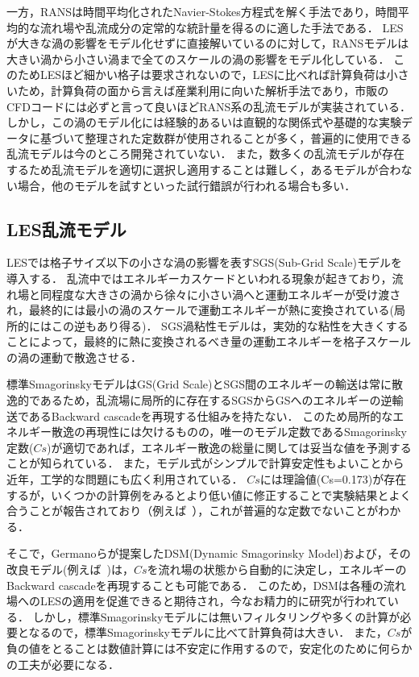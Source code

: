 一方，RANSは時間平均化されたNavier-Stokes方程式を解く手法であり，時間平均的な流れ場や乱流成分の定常的な統計量を得るのに適した手法である．
LESが大きな渦の影響をモデル化せずに直接解いているのに対して，RANSモデルは大きい渦から小さい渦まで全てのスケールの渦の影響をモデル化している．
このためLESほど細かい格子は要求されないので，LESに比べれば計算負荷は小さいため，計算負荷の面から言えば産業利用に向いた解析手法であり，市販のCFDコードには必ずと言って良いほどRANS系の乱流モデルが実装されている．
しかし，この渦のモデル化には経験的あるいは直観的な関係式や基礎的な実験データに基づいて整理された定数群が使用されることが多く，普遍的に使用できる乱流モデルは今のところ開発されていない．
また，数多くの乱流モデルが存在するため乱流モデルを適切に選択し適用することは難しく，あるモデルが合わない場合，他のモデルを試すといった試行錯誤が行われる場合も多い．

%
\subsection{LES乱流モデル}
LESでは格子サイズ以下の小さな渦の影響を表すSGS(Sub-Grid Scale)モデルを導入する．
乱流中ではエネルギーカスケードといわれる現象が起きており，流れ場と同程度な大きさの渦から徐々に小さい渦へと運動エネルギーが受け渡され，最終的には最小の渦のスケールで運動エネルギーが熱に変換されている(局所的にはこの逆もあり得る)．
SGS渦粘性モデルは，実効的な粘性を大きくすることによって，最終的に熱に変換されるべき量の運動エネルギーを格子スケールの渦の運動で散逸させる．

標準SmagorinskyモデルはGS(Grid Scale)とSGS間のエネルギーの輸送は常に散逸的であるため，乱流場に局所的に存在するSGSからGSへのエネルギーの逆輸送であるBackward cascadeを再現する仕組みを持たない．
このため局所的なエネルギー散逸の再現性には欠けるものの，唯一のモデル定数であるSmagorinsky定数($Cs$)が適切であれば，エネルギー散逸の総量に関しては妥当な値を予測することが知られている．
また，モデル式がシンプルで計算安定性もよいことから近年，工学的な問題にも広く利用されている．
$Cs$には理論値(Cs=0.173)が存在するが，いくつかの計算例をみるとより低い値に修正することで実験結果とよく合うことが報告されており（例えば~\cite{inagaki:03:JSFM}），これが普遍的な定数でないことがわかる．

そこで，Germanoら\cite{germano:91:PF}が提案したDSM(Dynamic Smagorinsky Model)および，その改良モデル(例えば~\cite{ghosal:95:JFM})は，$Cs$を流れ場の状態から自動的に決定し，エネルギーのBackward cascadeを再現することも可能である．
このため，DSMは各種の流れ場へのLESの適用を促進できると期待され，今なお精力的に研究が行われている．
しかし，標準Smagorinskyモデルには無いフィルタリングや多くの計算が必要となるので，標準Smagorinskyモデルに比べて計算負荷は大きい．
また，$Cs$が負の値をとることは数値計算には不安定に作用するので，安定化のために何らかの工夫が必要になる．


